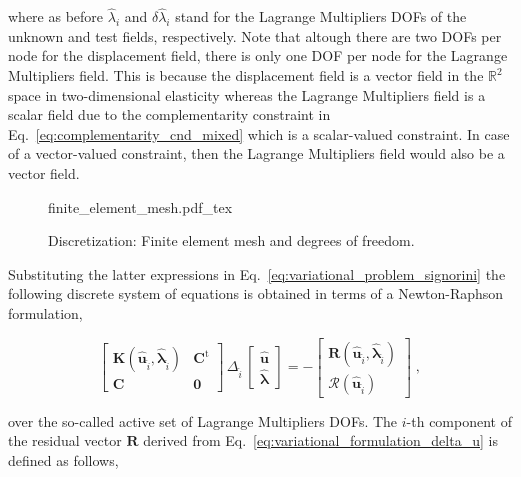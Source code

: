\documentclass[10pt,a4paper]{article}
\begin{document}
where as before $\hat{\lambda}_i$ and $\delta\hat{\lambda}_i$ stand for the Lagrange Multipliers DOFs of the unknown and test fields, respectively. Note that altough there are two DOFs per node for the displacement field, there is only one DOF per node for the Lagrange Multipliers field. This is because the displacement field is a vector field in the $\mathbb{R}^2$ space in two-dimensional elasticity whereas the Lagrange Multipliers field is a scalar field due to the complementarity constraint in Eq.~\eqref{eq:complementarity_cnd_mixed} which is a scalar-valued constraint. In case of a vector-valued constraint, then the Lagrange Multipliers field would also be a vector field.\\

\begin{figure}[!t]
	\centering
	\footnotesize
    \def\svgwidth{0.7\textwidth}{finite_element_mesh.pdf_tex}
	\caption{Discretization: Finite element mesh and degrees of freedom.}
	\label{im:finite_element_mesh}
\end{figure}

Substituting the latter expressions in Eq.~\eqref{eq:variational_problem_signorini} the following discrete system of equations is obtained in terms of a Newton-Raphson formulation,

\begin{equation}
	\left[ \begin{array}{cc}
		\mathbf{K} ( \hat{\mathbf{u}}_{\hat{i}} , \hat{\boldsymbol{\lambda}}_{\hat{i}} ) & \mathbf{C}^{\text{t}} \\
		\mathbf{C} & \mathbf{0}
\end{array}	 \right] \, \Delta_{\hat{i}} \, \left[ \begin{array}{c}
	\hat{\mathbf{u}} \\
	\hat{\boldsymbol{\lambda}}
\end{array} \right] = - \left[ \begin{array}{c}
	\mathbf{R} ( \hat{\mathbf{u}}_{\hat{i}} , \hat{\boldsymbol{\lambda}}_{\hat{i}} ) \\
	\boldsymbol{\mathcal{R}} ( \hat{\mathbf{u}}_{\hat{i}} )
\end{array} \right] \;, \label{eq:system_discrete_form_lagrange_multipliers}
\end{equation}

over the so-called active set of Lagrange Multipliers DOFs. The $i$-th component of the residual vector $\mathbf{R}$ derived from Eq.~\eqref{eq:variational_formulation_delta_u} is defined as follows,
\end{document}
